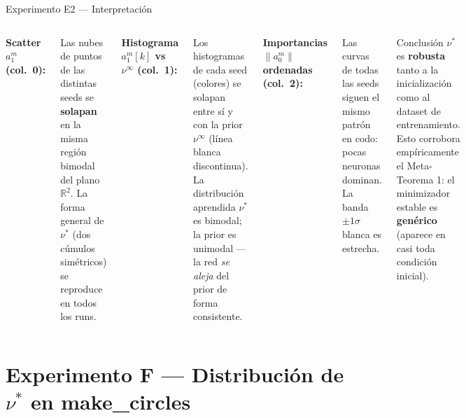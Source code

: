 \documentclass[10pt]{beamer}
\begin{document}
\begin{frame}{Experimento E2 — Interpretación}
\small
\begin{columns}

\textbf{Scatter $a_1^m$ (col.\ 0):}

Las nubes de puntos de las distintas seeds se \textbf{solapan} en la misma región bimodal del plano $\mathbb{R}^2$. La forma general de $\nu^*$ (dos cúmulos simétricos) se reproduce en todos los runs.

\medskip
\textbf{Histograma $a_1^m[k]$ vs $\nu^\infty$ (col.\ 1):}

Los histogramas de cada seed (colores) se solapan entre sí y con la prior $\nu^\infty$ (línea blanca discontinua). La distribución aprendida $\nu^*$ es bimodal; la prior es unimodal — la red \emph{se aleja} del prior de forma consistente.


\textbf{Importancias $\|a_0^m\|$ ordenadas (col.\ 2):}

Las curvas de todas las seeds siguen el mismo patrón en codo: pocas neuronas dominan. La banda $\pm 1\sigma$ blanca es estrecha.

\medskip
\begin{alertblock}{Conclusión}
  $\nu^*$ es \textbf{robusta} tanto a la inicialización como al dataset de entrenamiento. Esto corrobora empíricamente el Meta-Teorema 1: el minimizador estable es \textbf{genérico} (aparece en casi toda condición inicial).
\end{alertblock}
\end{columns}

\end{frame}

\section{Experimento F — Distribución de $\nu^*$ en make\_circles}
\end{document}
